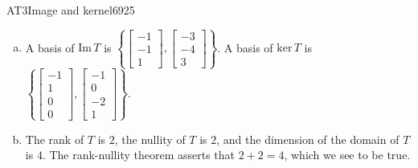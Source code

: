 \begin{exercise}{AT3}{Image and kernel}{6925}
\begin{exerciseAnswer}
\begin{enumerate}[(a)]
 
\item  

 A basis of \(\mathrm{Im}\,T\) is \(\left\{ \left[\begin{array}{c}
-1 \\
-1 \\
1
\end{array}\right] , \left[\begin{array}{c}
-3 \\
-4 \\
3
\end{array}\right] \right\}\). A basis of \(\mathrm{ker}\,T\) is \(\left\{ \left[\begin{array}{c}
-1 \\
1 \\
0 \\
0
\end{array}\right] , \left[\begin{array}{c}
-1 \\
0 \\
-2 \\
1
\end{array}\right] \right\}\). 

 
\item  

 The rank of \(T\) is \(2\), the nullity of \(T\) is \(2\), and the dimension of the domain of \(T\) is \(4\). The rank-nullity theorem asserts that \(2+2=4\), which we see to be true. 

 
\end{enumerate}

     \end{exerciseAnswer}
 \end{exercise}


